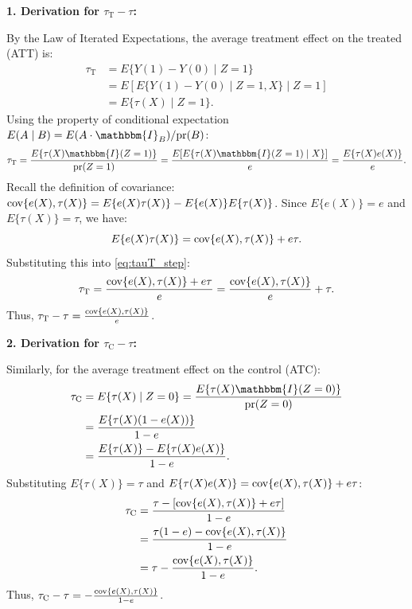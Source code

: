 \documentclass[krantz1]{krantz}
\def\pr{\textup{pr}}
\def\cov{\textup{cov}}
\begin{document}
\textbf{1. Derivation for $\tau_\mathrm{T} - \tau$:}

By the Law of Iterated Expectations, the average treatment effect on the treated (ATT) is:
\begin{align*}
    \tau_\mathrm{T} &= E\{Y(1) - Y(0) \mid Z=1\} \\
    &= E[ E\{Y(1) - Y(0) \mid Z=1, X\} \mid Z=1 ] \\
    &= E\{ \tau(X) \mid Z=1 \}.
\end{align*}
Using the property of conditional expectation $E(A \mid B) = E(A \cdot \mathbbm{I}_B) / \pr(B)$:
\begin{equation}
    \tau_\mathrm{T} = \frac{E\{ \tau(X) \mathbbm{I}(Z=1) \}}{\pr(Z=1)} = \frac{E[ E\{ \tau(X) \mathbbm{I}(Z=1) \mid X \} ]}{e} = \frac{E\{ \tau(X) e(X) \}}{e}. \label{eq:tauT_step}
\end{equation}
Recall the definition of covariance: $\cov\{e(X), \tau(X)\} = E\{e(X) \tau(X)\} - E\{e(X)\}E\{\tau(X)\}$. Since $E\{e(X)\} = e$ and $E\{\tau(X)\} = \tau$, we have:
\begin{equation*}
    E\{e(X) \tau(X)\} = \cov\{e(X), \tau(X)\} + e\tau.
\end{equation*}
Substituting this into \eqref{eq:tauT_step}:
\begin{equation*}
    \tau_\mathrm{T} = \frac{\cov\{e(X), \tau(X)\} + e\tau}{e} = \frac{\cov\{e(X), \tau(X)\}}{e} + \tau.
\end{equation*}
Thus, $\tau_\mathrm{T} - \tau = \frac{\cov\{e(X), \tau(X)\}}{e}$.

\vspace{1em}
\textbf{2. Derivation for $\tau_\mathrm{C} - \tau$:}

Similarly, for the average treatment effect on the control (ATC):
\begin{align*}
    \tau_\mathrm{C} &= E\{ \tau(X) \mid Z=0 \} = \frac{E\{ \tau(X) \mathbbm{I}(Z=0) \}}{\pr(Z=0)} \\
    &= \frac{E\{ \tau(X) (1 - e(X)) \}}{1-e} \\
    &= \frac{E\{\tau(X)\} - E\{\tau(X)e(X)\}}{1-e}.
\end{align*}
Substituting $E\{\tau(X)\} = \tau$ and $E\{\tau(X)e(X)\} = \cov\{e(X), \tau(X)\} + e\tau$:
\begin{align*}
    \tau_\mathrm{C} &= \frac{\tau - [\cov\{e(X), \tau(X)\} + e\tau]}{1-e} \\
    &= \frac{\tau(1-e) - \cov\{e(X), \tau(X)\}}{1-e} \\
    &= \tau - \frac{\cov\{e(X), \tau(X)\}}{1-e}.
\end{align*}
Thus, $\tau_\mathrm{C} - \tau = - \frac{\cov\{e(X), \tau(X)\}}{1-e}$.
\end{document}

